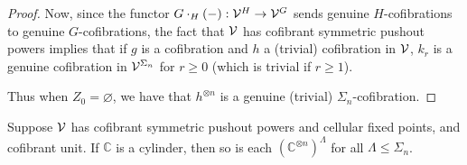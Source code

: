 \documentclass[a4paper,10pt
,draft
]{article}%
\renewcommand{\1}{\eta}%
\begin{document}
\begin{proof}
      Now, since the functor $G \cdot_H (-): \mathcal V^H \to \mathcal V^G$ sends genuine $H$-cofibrations to genuine $G$-cofibrations,
      the fact that $\mathcal V$ has cofibrant symmetric pushout powers implies that
      if $g$ is a cofibration and $h$ a (trivial) cofibration in $\mathcal V$,
      $k_r$ is a genuine cofibration in $\mathcal V^{\Sigma_n}$ for $r \geq 0$ (which is trivial if $r \geq 1$).

      Thus when $Z_0 = \varnothing$, we have that $h^{\otimes n}$ is a genuine (trivial) $\Sigma_n$-cofibration.
\end{proof}

\begin{lemma}
      \label{ASSEM_HOM_LEM}
      Suppose $\mathcal V$ has cofibrant symmetric pushout powers and cellular fixed points, and cofibrant unit.
      If $\mathbb C$ is a cylinder, then so is each $\left(\mathbb C^{\otimes n}\right)^{\Lambda}$ for all $\Lambda \leq \Sigma_n$.
\end{lemma}
\end{document}
